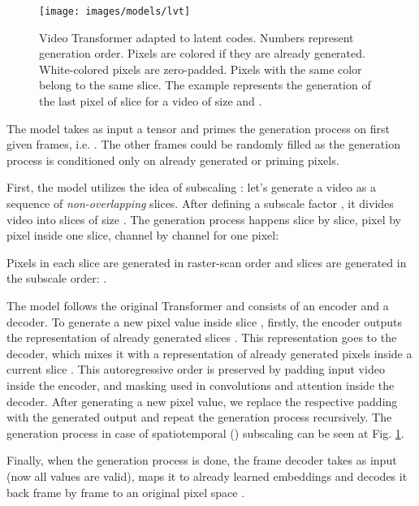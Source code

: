 \documentclass{article}
\begin{document}
\begin{figure}[h!]
\centering
\texttt{[image: images/models/lvt]}
\caption{Video Transformer adapted to latent codes. Numbers represent generation order. Pixels are colored if they are already generated. White-colored pixels are zero-padded. Pixels with the same color belong to the same slice. The example represents the generation of the last pixel of slice  for a video of size  and .}
\label{fig:lvt}
\end{figure}



The model takes as input a tensor  and primes the generation process on first  given frames, i.e. . The other frames could be randomly filled as the generation process is conditioned only on already generated or priming pixels.

First, the model utilizes the idea of subscaling \cite{pixelcnn_subscale}: let's generate a video as a sequence of \textit{non-overlapping} slices. After defining a subscale factor , it divides video into  slices of size . The generation process happens slice by slice, pixel by pixel inside one slice, channel by channel for one pixel:



Pixels in each slice  are generated in raster-scan order and slices are generated in the subscale order: .

The model follows the original Transformer \cite{transformer} and consists of an encoder and a decoder. To generate a new pixel value inside slice , firstly, the encoder outputs the representation of already generated slices . This representation goes to the decoder, which mixes it with a representation of already generated pixels inside a current slice . This autoregressive order is preserved by padding input video inside the encoder, and masking used in convolutions and attention inside the decoder. After generating a new pixel value, we replace the respective padding with the generated output and repeat the generation process recursively. The generation process in case of spatiotemporal () subscaling can be seen at Fig. \ref{fig:lvt}.

Finally, when the generation process is done, the frame decoder takes as input  (now all values are valid), maps it to already learned embeddings  and decodes it back frame by frame to an original pixel space .
\end{document}
